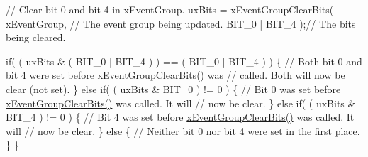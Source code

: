 \begin{DoxyPre}    // Clear bit 0 and bit 4 in xEventGroup.
    uxBits = xEventGroupClearBits(
                            xEventGroup,    // The event group being updated.
                            BIT\_0 | BIT\_4 );// The bits being cleared.\end{DoxyPre}



\begin{DoxyPre}    if( ( uxBits \& ( BIT\_0 | BIT\_4 ) ) == ( BIT\_0 | BIT\_4 ) )
    \{
        // Both bit 0 and bit 4 were set before \hyperlink{event__groups_8h_a0fb72cfdd4f0d5f86d955fc3af448f2a}{xEventGroupClearBits()} was
        // called.  Both will now be clear (not set).
    \}
    else if( ( uxBits \& BIT\_0 ) != 0 )
    \{
        // Bit 0 was set before \hyperlink{event__groups_8h_a0fb72cfdd4f0d5f86d955fc3af448f2a}{xEventGroupClearBits()} was called.  It will
        // now be clear.
    \}
    else if( ( uxBits \& BIT\_4 ) != 0 )
    \{
        // Bit 4 was set before \hyperlink{event__groups_8h_a0fb72cfdd4f0d5f86d955fc3af448f2a}{xEventGroupClearBits()} was called.  It will
        // now be clear.
    \}
    else
    \{
        // Neither bit 0 nor bit 4 were set in the first place.
    \}
  \}
  \end{DoxyPre}
 